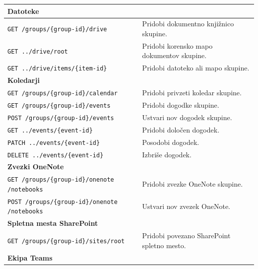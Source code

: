 \documentclass[a4paper, 12pt]{book}
\begin{document}
\begin{longtable}{|p{7cm}|p{7.5cm}|}
\multicolumn{2}{|l|}{\textbf{Datoteke}} \\
\hline

\texttt{GET /groups/\{group-id\}/drive} &
Pridobi dokumentno knjižnico skupine. \\
\hline

\texttt{GET ../drive/root} &
Pridobi korensko mapo dokumentov skupine. \\
\hline

\texttt{GET ../drive/items/\{item-id\}} &
Pridobi datoteko ali mapo skupine. \\
\hline

\multicolumn{2}{|l|}{\textbf{Koledarji}} \\
\hline

\texttt{GET /groups/\{group-id\}/calendar} &
Pridobi privzeti koledar skupine. \\
\hline

\texttt{GET /groups/\{group-id\}/events} &
Pridobi dogodke skupine. \\
\hline

\texttt{POST /groups/\{group-id\}/events} &
Ustvari nov dogodek skupine. \\
\hline

\texttt{GET ../events/\{event-id\}} &
Pridobi določen dogodek. \\
\hline

\texttt{PATCH ../events/\{event-id\}} &
Posodobi dogodek. \\
\hline

\texttt{DELETE ../events/\{event-id\}} &
Izbriše dogodek. \\
\hline

\multicolumn{2}{|l|}{\textbf{Zvezki OneNote}} \\
\hline

\texttt{GET /groups/\{group-id\}/onenote
/notebooks} &
Pridobi zvezke OneNote skupine. \\
\hline

\texttt{POST /groups/\{group-id\}/onenote
/notebooks} &
Ustvari nov zvezek OneNote. \\
\hline

\multicolumn{2}{|l|}{\textbf{Spletna mesta SharePoint}} \\
\hline

\texttt{GET /groups/\{group-id\}/sites/root} &
Pridobi povezano SharePoint spletno mesto. \\
\hline

\multicolumn{2}{|l|}{\textbf{Ekipa Teams}} \\
\hline


\end{longtable}
\end{document}
